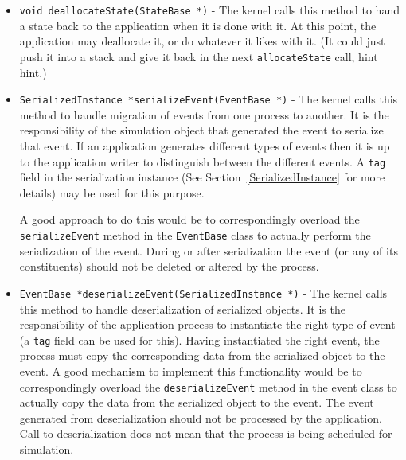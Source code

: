 \documentclass[11pt]{article}
\begin{document}
\begin{itemize}
\item{\tt void deallocateState(StateBase *)} - The kernel calls this
  method to hand a state back to the application when it is done with it.
  At this point, the application may deallocate it, or do whatever it
  likes with it.  (It could just push it into a stack and give it back in
  the next {\tt allocateState} call, hint hint.)

\item{\tt SerializedInstance *serializeEvent(EventBase *)} -
  The kernel calls this method to handle migration of events from one
  process to another. It is the responsibility of the simulation object
  that generated the event to serialize that event. If an application
  generates different types of events then it is up to the application
  writer to distinguish between the different events. A {\tt tag} field in
  the serialization instance (See Section~\ref{SerializedInstance} for more
  details) may be used for this purpose.

  A good approach to do this would be to correspondingly overload the {\tt
  serializeEvent} method in the {\tt EventBase} class to actually perform
  the serialization of the event. During or after serialization the event
  (or any of its constituents) should not be deleted or altered by the
  process.

\item{\tt EventBase *deserializeEvent(SerializedInstance *)} -  The kernel
  calls this method to handle deserialization of serialized objects. It is
  the responsibility of the application process to instantiate the right
  type of event (a {\tt tag} field can be used for this). Having
  instantiated the right event, the process must copy the corresponding
  data from the serialized object to the event. A good mechanism to
  implement this functionality would be to correspondingly overload the
  {\tt deserializeEvent} method in the event class to actually copy the
  data from the serialized object to the event.  The event generated from
  deserialization should not be processed by the application.  Call to
  deserialization does not mean that the process is being scheduled for
  simulation.



\end{itemize}
\end{document}
